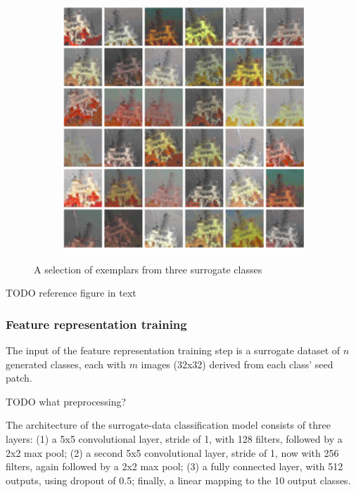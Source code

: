 \documentclass{article} %
\begin{document}
\begin{figure}[h]
\begin{subfigure}{0.3\textwidth}
\end{subfigure}
\begin{subfigure}{0.3\textwidth}
  \centering
  \includegraphics[width=\textwidth]{figs/patch_noflip_boattop.png}
\end{subfigure}
\label{figpatch}
\caption{A selection of exemplars from three surrogate classes}
\end{figure}

TODO reference figure in text

\subsubsection{Feature representation training}
The input of the feature representation training step is a surrogate dataset of $n$ generated classes, each with $m$ images (32x32) derived from each class' seed patch.

TODO what preprocessing?

The architecture of the surrogate-data classification model consists of three layers: (1) a 5x5 convolutional layer, stride of 1, with 128 filters, followed by a 2x2 max pool; (2) a second 5x5 convolutional layer, stride of 1, now with 256 filters, again followed by a 2x2 max pool; (3) a fully connected layer, with 512 outputs, using dropout of 0.5; finally, a linear mapping to the 10 output classes.
\end{document}
